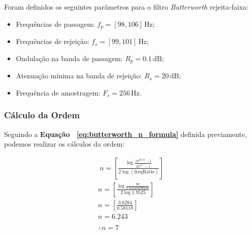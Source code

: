 Foram definidos os seguintes parâmetros para o filtro \textit{Butterworth} rejeita-faixa:

\begin{itemize}
    \item Frequências de passagem: $f_p = [98, 106] \, \text{Hz}$;
    \item Frequências de rejeição: $f_s = [99, 101] \, \text{Hz}$;
    \item Ondulação na banda de passagem: $R_p = 0.1 \, \text{dB}$;
    \item Atenuação mínima na banda de rejeição: $R_s = 20 \, \text{dB}$;
    \item Frequência de amostragem: $F_s = 256 \, \text{Hz}$.
\end{itemize}

\subsubsection*{Cálculo da Ordem}
Seguindo a \textbf{Equação ~\ref{eq:butterworth_n_formula}} definida previamente, podemos realizar os cálculos da ordem:

\begin{align*} \
    n = \left[ \frac{\log{\frac{10^{20/10}- 1}{10^{10^{-2}}-1}}}{2\log{(\text{freqRatio})}} \right] \\
    n = \left[ \frac{\log{\frac{99}{0.02329299228}}}{2\log{1.9525}} \right]                         \\
    n = \left[ \frac{3.6284}{0.58118} \right]                                                       \\
    n = 6.243                                                                                       \\
    \\
    \therefore n = 7
\end{align*}
